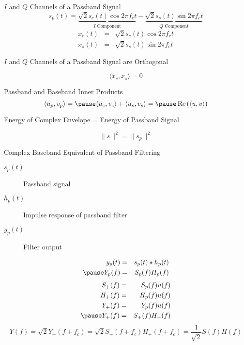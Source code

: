 \documentclass[t]{beamer}
\renewcommand\Re{\operatorname{Re}}
\begin{document}
\begin{frame}{$I$ and $Q$ Channels of a Passband Signal}
  \begin{equation*}
    s_p(t) = \underbrace{\sqrt{2}s_c(t)\cos 2\pi f_ct}_{I \text{ Component}}- \underbrace{\sqrt{2}s_s(t)\sin 2\pi f_c t}_{Q \text{ Component}}
  \end{equation*}
  \pause
  \begin{eqnarray*}
    x_c(t) & = & \sqrt{2}s_c(t)\cos 2\pi f_ct \\
    x_s(t) & = & \sqrt{2}s_s(t)\sin 2\pi f_ct
  \end{eqnarray*}
  \pause
  \begin{center}
    $I$ and $Q$ Channels of a Passband Signal are Orthogonal
  \end{center}
  \begin{equation*}
    \langle x_c,x_s \rangle = 0
  \end{equation*}
\end{frame}

\begin{frame}{Passband and Baseband Inner Products}
  \begin{equation*}
    \langle u_p,v_p \rangle = \pause \langle u_c,v_c \rangle + \langle u_s,v_s \rangle = \pause \Re\left(\langle u,v \rangle\right)
  \end{equation*}
  \pause
  \begin{center}
    Energy of Complex Envelope = Energy of Passband Signal
  \end{center}
  \begin{equation*}
    \lVert s \rVert^2 = \lVert s_p \rVert^2
  \end{equation*}
\end{frame}

\begin{frame}{Complex Baseband Equivalent of Passband Filtering}
  \begin{description}
    \item[$s_p(t)$] Passband signal
    \item[$h_p(t)$] Impulse response of passband filter
    \item[$y_p(t)$] Filter output
  \end{description}
  \pause
  \begin{eqnarray*}
    y_p(t) & = & s_p(t) \star h_p(t) \\
    \pause
    Y_p(f) & = & S_p(f)H_p(f)
  \end{eqnarray*}
  \pause
  \begin{eqnarray*}
    S_+(f) & = & S_p(f)u(f) \\
    H_+(f) & = & H_p(f)u(f) \\
    Y_+(f) & = & Y_p(f)u(f) \\
    \pause
    Y_+(f) & = & S_+(f)H_+(f)
  \end{eqnarray*}
  \pause
  \begin{equation*}
    Y(f)  =  \sqrt{2}Y_+(f+f_c) = \sqrt{2}S_+(f+f_c)H_+(f+f_c) = \frac{1}{\sqrt{2}}S(f)H(f) 
  \end{equation*}
\end{frame}
\end{document}
